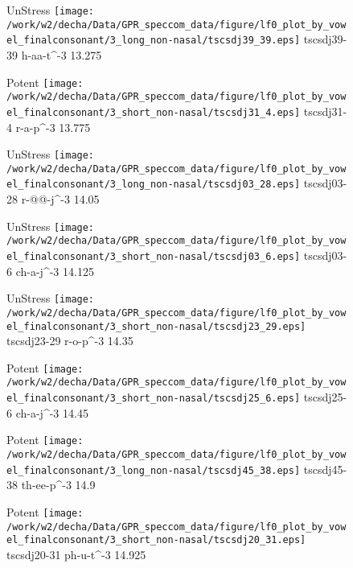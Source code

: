 \documentclass{article}
\begin{document}
\begin{figure}[t]
\begin{minipage}[b]{.24\textwidth}
UnStress
\centering
\texttt{[image: /work/w2/decha/Data/GPR\_speccom\_data/figure/lf0\_plot\_by\_vowel\_finalconsonant/3\_long\_non-nasal/tscsdj39\_39.eps]}
tscsdj39-39 h-aa-t\textasciicircum-3 13.275
\end{minipage}
\begin{minipage}[b]{.24\textwidth}
\colorbox{Apricot}{Potent}
\centering
\texttt{[image: /work/w2/decha/Data/GPR\_speccom\_data/figure/lf0\_plot\_by\_vowel\_finalconsonant/3\_short\_non-nasal/tscsdj31\_4.eps]}
tscsdj31-4 r-a-p\textasciicircum-3 13.775
\end{minipage}
\begin{minipage}[b]{.24\textwidth}
UnStress
\centering
\texttt{[image: /work/w2/decha/Data/GPR\_speccom\_data/figure/lf0\_plot\_by\_vowel\_finalconsonant/3\_long\_non-nasal/tscsdj03\_28.eps]}
tscsdj03-28 r-@@-j\textasciicircum-3 14.05
\end{minipage}
\begin{minipage}[b]{.24\textwidth}
UnStress
\centering
\texttt{[image: /work/w2/decha/Data/GPR\_speccom\_data/figure/lf0\_plot\_by\_vowel\_finalconsonant/3\_short\_non-nasal/tscsdj03\_6.eps]}
tscsdj03-6 ch-a-j\textasciicircum-3 14.125
\end{minipage}
\end{figure}

\begin{figure}[t]
\begin{minipage}[b]{.24\textwidth}
UnStress
\centering
\texttt{[image: /work/w2/decha/Data/GPR\_speccom\_data/figure/lf0\_plot\_by\_vowel\_finalconsonant/3\_short\_non-nasal/tscsdj23\_29.eps]}
tscsdj23-29 r-o-p\textasciicircum-3 14.35
\end{minipage}
\begin{minipage}[b]{.24\textwidth}
\colorbox{Apricot}{Potent}
\centering
\texttt{[image: /work/w2/decha/Data/GPR\_speccom\_data/figure/lf0\_plot\_by\_vowel\_finalconsonant/3\_short\_non-nasal/tscsdj25\_6.eps]}
tscsdj25-6 ch-a-j\textasciicircum-3 14.45
\end{minipage}
\begin{minipage}[b]{.24\textwidth}
\colorbox{Apricot}{Potent}
\centering
\texttt{[image: /work/w2/decha/Data/GPR\_speccom\_data/figure/lf0\_plot\_by\_vowel\_finalconsonant/3\_long\_non-nasal/tscsdj45\_38.eps]}
tscsdj45-38 th-ee-p\textasciicircum-3 14.9
\end{minipage}
\begin{minipage}[b]{.24\textwidth}
\colorbox{Apricot}{Potent}
\centering
\texttt{[image: /work/w2/decha/Data/GPR\_speccom\_data/figure/lf0\_plot\_by\_vowel\_finalconsonant/3\_short\_non-nasal/tscsdj20\_31.eps]}
tscsdj20-31 ph-u-t\textasciicircum-3 14.925
\end{minipage}
\end{figure}
\end{document}
